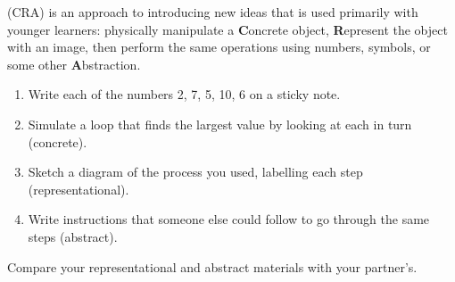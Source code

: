 
 (CRA)
is an approach to introducing new ideas
that is used primarily with younger learners:
physically manipulate a \textbf{C}oncrete object,
\textbf{R}epresent the object with an image,
then perform the same operations
using numbers, symbols, or some other \textbf{A}bstraction.

\begin{enumerate}

\item
  Write each of the numbers 2, 7, 5, 10, 6 on a sticky note.

\item
  Simulate a loop that finds the largest value by looking at each in turn (concrete).

\item
  Sketch a diagram of the process you used,
  labelling each step (representational).

\item
  Write instructions that someone else could follow
  to go through the same steps (abstract).
\end{enumerate}

Compare your representational and abstract materials with your partner's.
